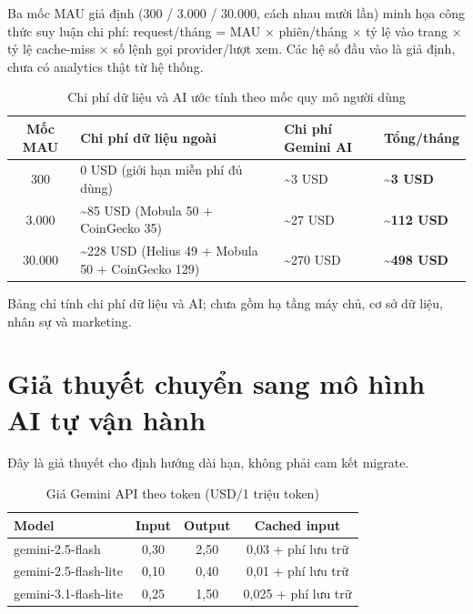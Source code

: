 Ba mốc MAU giả định (300 / 3.000 / 30.000, cách nhau mười lần) minh họa công thức suy luận chi phí: request/tháng = MAU × phiên/tháng × tỷ lệ vào trang × tỷ lệ cache-miss × số lệnh gọi provider/lượt xem. Các hệ số đầu vào là giả định, chưa có analytics thật từ hệ thống.

\begin{table}[H]
\centering
\caption{Chi phí dữ liệu và AI ước tính theo mốc quy mô người dùng}
\label{tab:cost-by-scale}
\begin{tabularx}{\textwidth}{|c|X|X|X|}
\hline
\textbf{Mốc MAU} & \textbf{Chi phí dữ liệu ngoài} & \textbf{Chi phí Gemini AI} & \textbf{Tổng/tháng} \\
\hline
300 & 0 USD (giới hạn miễn phí đủ dùng) & \textasciitilde 3 USD & \textbf{\textasciitilde 3 USD} \\
\hline
3.000 & \textasciitilde 85 USD (Mobula 50 + CoinGecko 35) & \textasciitilde 27 USD & \textbf{\textasciitilde 112 USD} \\
\hline
30.000 & \textasciitilde 228 USD (Helius 49 + Mobula 50 + CoinGecko 129) & \textasciitilde 270 USD & \textbf{\textasciitilde 498 USD} \\
\hline
\end{tabularx}
\end{table}

Bảng chỉ tính chi phí dữ liệu và AI; chưa gồm hạ tầng máy chủ, cơ sở dữ liệu, nhân sự và marketing.

\section{Giả thuyết chuyển sang mô hình AI tự vận hành}

Đây là giả thuyết cho định hướng dài hạn, không phải cam kết migrate.

\begin{table}[H]
\centering
\small
\caption{Giá Gemini API theo token (USD/1 triệu token) \cite{gemini-pricing}}
\label{tab:gemini-pricing}
\begin{tabularx}{\textwidth}{|X|c|c|c|}
\hline
\textbf{Model} & \textbf{Input} & \textbf{Output} & \textbf{Cached input} \\
\hline
gemini-2.5-flash & 0,30 & 2,50 & 0,03 + phí lưu trữ \\
\hline
gemini-2.5-flash-lite & 0,10 & 0,40 & 0,01 + phí lưu trữ \\
\hline
gemini-3.1-flash-lite & 0,25 & 1,50 & 0,025 + phí lưu trữ \\
\hline
\end{tabularx}
\end{table}

